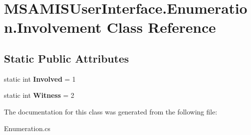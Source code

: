 \hypertarget{class_m_s_a_m_i_s_user_interface_1_1_enumeration_1_1_involvement}{}\section{M\+S\+A\+M\+I\+S\+User\+Interface.\+Enumeration.\+Involvement Class Reference}
\label{class_m_s_a_m_i_s_user_interface_1_1_enumeration_1_1_involvement}
\subsection*{Static Public Attributes}
\begin{DoxyCompactItemize}
\item 
\mbox{\label{class_m_s_a_m_i_s_user_interface_1_1_enumeration_1_1_involvement_a0739aeb89bc7354d22a11e80dafd8a3a}} 
static int {\bfseries Involved} = 1
\item 
\mbox{\label{class_m_s_a_m_i_s_user_interface_1_1_enumeration_1_1_involvement_ac765334c967a87a8d97206eb07da576f}} 
static int {\bfseries Witness} = 2
\end{DoxyCompactItemize}


The documentation for this class was generated from the following file\+:\begin{DoxyCompactItemize}
\item 
Enumeration.\+cs\end{DoxyCompactItemize}
